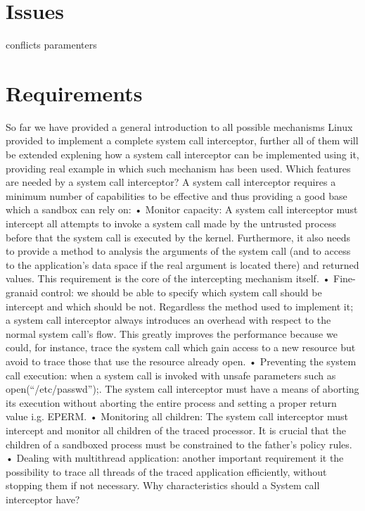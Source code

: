 \section{ Issues}

conflicts paramenters

\section{Requirements}
So far we have provided a general introduction to all possible mechanisms Linux provided to implement a complete system call interceptor, further all of them will be extended explening how a system call interceptor can be implemented using it, providing real example in which such mechanism has been used.
Which features are needed by a system call interceptor?
A system call interceptor requires a minimum number of capabilities to be effective and thus providing a good base which a sandbox can rely on:
•	Monitor capacity:  A system call interceptor must intercept all attempts to invoke a system call made by the untrusted process before that the system call is executed by the kernel. Furthermore, it also needs to provide a method to analysis the arguments of the system call (and to access to the application’s data space if the real argument is located there) and returned values. This requirement is the core of the intercepting mechanism itself.  
•	Fine-granaid control: we should be able to specify which system call should be intercept and which should be not. Regardless the method used to implement it; a system call interceptor always introduces an overhead with respect to the normal system call’s flow. This greatly improves the performance because we could, for instance, trace the system call which gain access to a new resource but avoid to trace those that use the resource already open.    
•	Preventing the system call execution: when a system call is invoked with unsafe parameters such as open(“/etc/passwd”);. The system call interceptor must have a means of aborting its execution without aborting the entire process and setting a proper return value i.g. EPERM. 
•	Monitoring all children:  The system call interceptor must intercept and monitor all children of the traced processor. It is crucial that the children of a sandboxed process must be constrained to the father's policy rules.
•	Dealing with multithread application: another important requirement it the possibility to trace all threads of the traced application efficiently, without stopping them if not necessary. 
Why characteristics should a System call interceptor have? 


